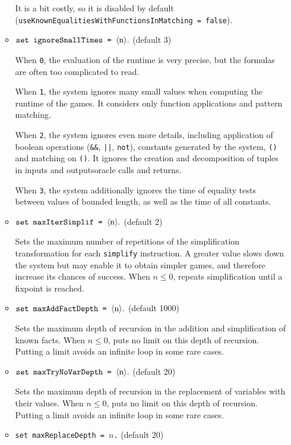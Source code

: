 \begin{itemize}
\begin{itemize}
It is a bit costly, so it is disabled by default
(\texttt{useKnownEqualitiesWithFunctionsInMatching = false}).

\item $\texttt{set ignoreSmallTimes = }\langle\textrm{n}\rangle{\tt .}$ (default 3)

When {\tt 0}, the evaluation of the runtime is very precise,
but the formulas are often too complicated to read.

When {\tt 1}, the system ignores many small values when computing
the runtime of the games. It considers only function applications
and pattern matching.

When {\tt 2}, the system ignores even more details, including
application of boolean operations (\texttt{\&\&},
\texttt{\string|\string|}, \texttt{not}), constants generated by the
system, \texttt{()} and matching on \texttt{()}. It ignores the
creation and decomposition of tuples in \ifchannels
inputs and outputs\else oracle calls and returns\fi.

When {\tt 3}, the system additionally ignores the time of equality
tests between values of bounded length, as well as the time of
all constants.

\item $\texttt{set maxIterSimplif = }\langle\textrm{n}\rangle{\tt .}$ (default 2)

Sets the maximum number of repetitions of the simplification transformation
for each {\tt simplify} instruction.
A greater value slows down the system but may enable it to obtain
simpler games, and therefore increase its chances of success.
When $n \leq 0$, repeats simplification until a fixpoint is reached.

\item $\texttt{set maxAddFactDepth = }\langle\textrm{n}\rangle{\tt .}$ (default 1000)

Sets the maximum depth of recursion in the addition and simplification
of known facts. 
When $n \leq 0$, puts no limit on this depth of recursion.
Putting a limit avoids an infinite loop in some rare cases.

\item $\texttt{set maxTryNoVarDepth = }\langle\textrm{n}\rangle{\tt .}$ (default 20)

Sets the maximum depth of recursion in the replacement of
variables with their values.
When $n \leq 0$, puts no limit on this depth of recursion.
Putting a limit avoids an infinite loop in some rare cases.

\item \texttt{set maxReplaceDepth = $n$.} (default 20)


\end{itemize}
\end{itemize}
